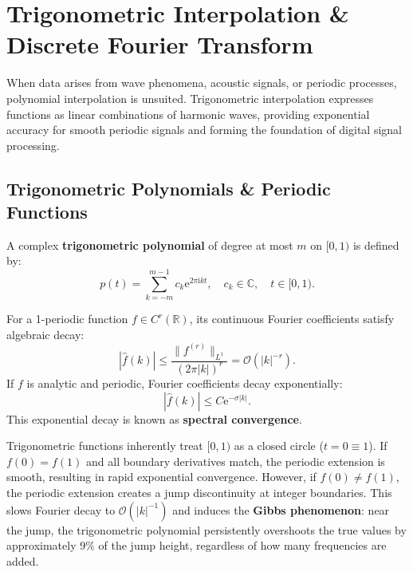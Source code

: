 \section{Trigonometric Interpolation \& Discrete Fourier Transform}

When data arises from wave phenomena, acoustic signals, or periodic processes, polynomial interpolation is unsuited. Trigonometric interpolation expresses functions as linear combinations of harmonic waves, providing exponential accuracy for smooth periodic signals and forming the foundation of digital signal processing.

\subsection{Trigonometric Polynomials \& Periodic Functions}

\begin{definition}
    A complex \textbf{trigonometric polynomial} of degree at most $m$ on $[0, 1)$ is defined by:
    \begin{equation}
        p(t) = \sum_{k=-m}^{m-1} c_k \mathrm{e}^{2\pi \mathrm{i} k t}, \quad c_k \in \mathbb{C}, \quad t \in [0, 1).
    \end{equation}
\end{definition}

For a 1-periodic function $f \in C^r(\mathbb{R})$, its continuous Fourier coefficients satisfy algebraic decay:
\begin{equation}
    |\hat{f}(k)| \le \frac{\|f^{(r)}\|_{L^1}}{(2\pi |k|)^r} = \mathcal{O}(|k|^{-r}).
\end{equation}
If $f$ is analytic and periodic, Fourier coefficients decay exponentially:
\begin{equation}
    |\hat{f}(k)| \le C \mathrm{e}^{-\sigma |k|}.
\end{equation}
This exponential decay is known as \textbf{spectral convergence}.

Trigonometric functions inherently treat $[0, 1)$ as a closed circle ($t = 0 \equiv 1$). If $f(0) = f(1)$ and all boundary derivatives match, the periodic extension is smooth, resulting in rapid exponential convergence. However, if $f(0) \neq f(1)$, the periodic extension creates a jump discontinuity at integer boundaries. This slows Fourier decay to $\mathcal{O}(|k|^{-1})$ and induces the \textbf{Gibbs phenomenon}: near the jump, the trigonometric polynomial persistently overshoots the true values by approximately $9\%$ of the jump height, regardless of how many frequencies are added.

